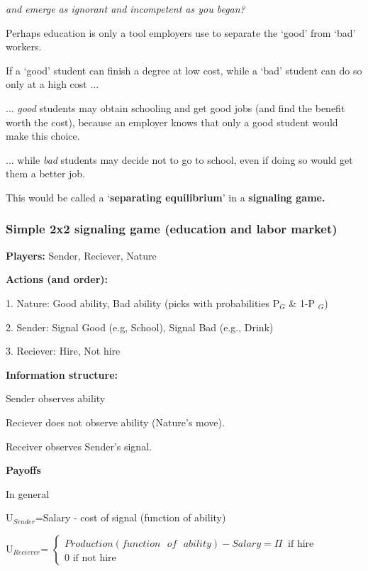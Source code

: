\documentclass{article}
\begin{document}
\textit{and emerge as ignorant and incompetent as you began? \ }

Perhaps education is only a tool employers use to separate the `good' from
`bad' workers.

\bigskip

If a `good' student can finish a degree at low cost, while a `bad' student
can do so only at a high cost ...

... \textit{good} students may obtain schooling and get good jobs (and find
the benefit worth the cost), because an employer knows that only a good
student would make this choice.

... while \textit{bad }students may decide not to go to school, even if
doing so would get them a better job.

This would be called a `\textbf{separating equilibrium}' in a \textbf{%
signaling game.}

\pagebreak

\subsubsection{Simple 2x2 signaling game (education and labor market)}

\textbf{Players: }Sender, Reciever, Nature

\bigskip

\textbf{Actions (and order):}

1. Nature: Good ability, Bad ability (picks with probabilities P$_{G}$ \& 1-P%
$_{G}$)

2. Sender: Signal Good (e.g, School), Signal Bad (e.g., Drink)

3. Reciever: Hire, Not hire

\bigskip

\textbf{Information structure:}

Sender observes ability

Reciever does not observe ability (Nature's move).

Receiver observes Sender's signal.

\bigskip

\textbf{Payoffs}

In general

U$_{Sender}$=Salary - cost of signal (function of ability)

U$_{Reciever}$= $\left\{ 
\begin{array}{c}
Production(function\text{ }of\text{ }ability)-Salary=\Pi \ \text{\ if hire}
\\ 
0\text{ if not hire}%
\end{array}%
\right. $
\end{document}
